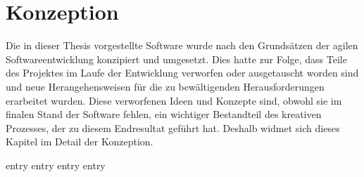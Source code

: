 \chapter{Konzeption}
\label{chap:konzeption}

Die in dieser Thesis vorgestellte Software wurde nach den Grundsätzen der agilen
Softwareentwicklung \cite{agile} konzipiert und umgesetzt.  Dies hatte zur
Folge, dass Teile des Projektes im Laufe der Entwicklung verworfen oder
ausgetauscht worden sind und neue Herangehensweisen für die zu bewältigenden
Herausforderungen erarbeitet wurden.  Diese verworfenen Ideen und Konzepte sind,
obwohl sie im finalen Stand der Software fehlen, ein wichtiger Bestandteil des
kreativen Prozesses, der zu diesem Endresultat geführt hat.  Deshalb widmet sich
dieses Kapitel im Detail der Konzeption.

{entry}
{entry}
{entry}
{entry}
